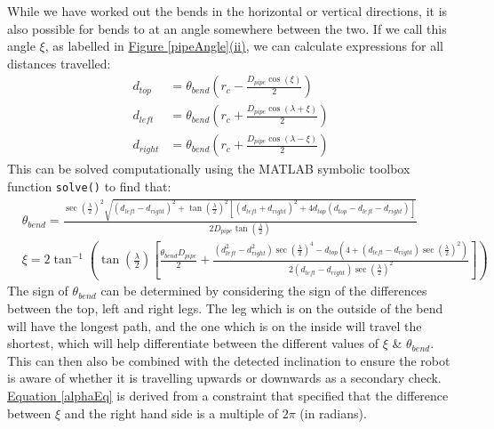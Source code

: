 \documentclass[11pt]{article}		%
\begin{document}
		While we have worked out the bends in the horizontal or vertical directions, it is also possible for bends to at an angle somewhere between the two.
		If we call this angle $\xi$, as labelled in \hyperref[pipeAngle]{Figure \ref*{pipeAngle}(ii)}, we can calculate expressions for all distances travelled:
		\begin{align}
			d_{top} &= \theta_{bend} \left( r_c - \frac{D_{pipe} \cos \left( \xi \right)}{2} \right) \label{d_top}
			\\
			d_{left} &= \theta_{bend} \left( r_c +  \frac{D_{pipe} \cos \left( \lambda + \xi \right)}{2} \right) \label{d_left}
			\\
			d_{right} &= \theta_{bend} \left( r_c +  \frac{D_{pipe} \cos \left( \lambda - \xi \right)}{2} \right) \label{d_right}
		\end{align}
		This can be solved computationally using the MATLAB symbolic toolbox function \verb|solve()| to find that:	
		\fontsize{10}{\baselineskip}
		\begin{align}
			&\theta_{bend} = \frac{ \sec \left( \frac{\lambda}{2} \right)^2 \sqrt{ \left( d_{left} - d_{right} \right)^2 +  \tan \left( \frac{\lambda}{2} \right)^2 \left[ \left( d_{left} + d_{right} \right)^2 + 4 d_{top} \left( d_{top} - d_{left} - d_{right} \right) \right] } }{2 D_{pipe} \tan \left( \frac{\lambda}{2} \right)} \label{generalTheta}
			\\
			&\xi = 2 \tan^{-1} \left( \tan \left( \frac{\lambda}{2} \right) \left[\frac{ \theta_{bend} D_{pipe}}{2} + \frac{\left( d_{left}^2 - d_{right}^2 \right) \sec \left( \frac{\lambda}{2} \right)^4 - d_{top} \left(4 + \left( d_{left} - d_{right} \right) \sec \left( \frac{\lambda}{2} \right)^2 \right)}{2 \left( d_{left} - d_{right} \right) \sec \left( \frac{\lambda}{2} \right)^2} \right] \right) \label{alphaEq}
		\end{align}
		\fontsize{11}{\baselineskip}
		The sign of $\theta_{bend}$ can be determined by considering the sign of the differences between the top, left and right legs.
		The leg which is on the outside of the bend will have the longest path, and the one which is on the inside will travel the shortest, which will help differentiate between the different values of $\xi$ \& $\theta_{bend}$.
		This can then also be combined with the detected inclination to ensure the robot is aware of whether it is travelling upwards or downwards as a secondary check.
		\\
		\hyperref[alphaEq]{Equation \ref*{alphaEq}} is derived from a constraint that specified that the difference between $\xi$ and the right hand side is a multiple of $2 \pi$ (in radians).
\end{document}
